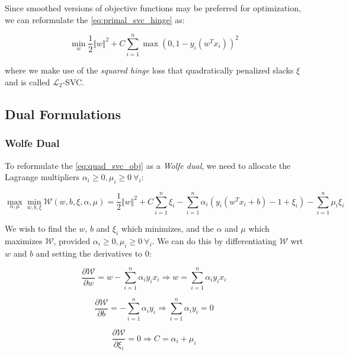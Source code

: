 Since smoothed versions of objective functions may be preferred for optimization, we can reformulate the \ref{eq:primal_svc_hinge} as:

\begin{equation}
    \min_{w} \frac{1}{2} \Vert w \Vert^2 + C \sum_{i=1}^n \max(0, 1 - y_i (w^T x_i))^2 \label{eq:primal_svc_sq_hinge}
\end{equation}

where we make use of the \emph{squared hinge} loss that quadratically penalized slacks $\xi$ and is called $\mathcal{L}_2$-SVC.

\pagebreak

\subsection{Dual Formulations}

\subsubsection{Wolfe Dual}

To reformulate the \ref{eq:quad_svc_obj} as a \emph{Wolfe dual}, we need to allocate the Lagrange multipliers $\alpha_i\geq 0, \mu_i \geq 0 \ \forall_i$:

\begin{equation}
    \max_{\alpha,\mu} \min_{w,b,\xi} \mathcal{W}(w,b,\xi,\alpha,\mu) = \frac{1}{2}\Vert w\Vert^{2}+C\sum_{i=1}^n\xi_i-\sum_{i=1}^n\alpha_i(y_i(w^T x_i + b)-1+\xi_i)-\sum_{i=1}^n\mu_i\xi_i \label{eq:svc_wolfe_dual}
\end{equation}

We wish to find the $w$, $b$ and $\xi_i$ which minimizes, and the $\alpha$ and $\mu$ which maximizes $\mathcal{W}$, provided $\alpha_i\geq 0, \mu_i \geq 0 \ \forall_i$. We can do this by differentiating $\mathcal{W}$ wrt $w$ and $b$ and setting the derivatives to 0:

\begin{equation}
	\frac{\partial \mathcal{W}}{\partial w}=w-\sum_{i=1}^{n}\alpha_i y_i x_i \Rightarrow w=\sum_{i=1}^{n}\alpha_i y_i x_i \label{eq:svc_wolfe_der_w}
\end{equation}

\begin{equation}
	\frac{\partial \mathcal{W}}{\partial b}=-\sum_{i=1}^{n}\alpha_i y_i\Rightarrow\sum_{i=1}^{n}\alpha_i y_i=0 \label{eq:svc_wolfe_der_b}
\end{equation}

\begin{equation}
	\frac{\partial \mathcal{W}}{\partial\xi_i}=0\Rightarrow C=\alpha_i+\mu_i \label{eq:svc_wolfe_der_xi}
\end{equation}


